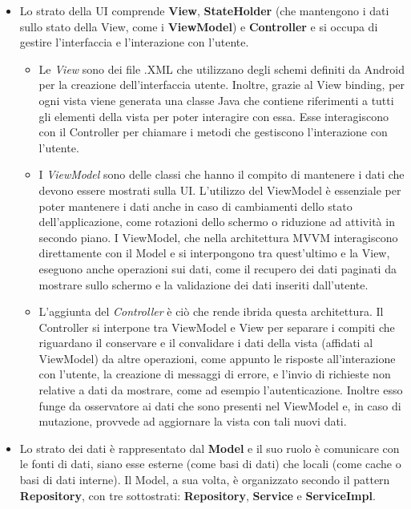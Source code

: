             \begin{itemize}
                \item Lo strato della UI comprende \textbf{View}, \textbf{StateHolder} (che mantengono i dati sullo stato della View, come i \textbf{ViewModel}) e \textbf{Controller} e si occupa di gestire l'interfaccia e l'interazione con l'utente.
                    \begin{itemize}
                        \item Le \textit{View} sono dei file .XML che utilizzano degli schemi definiti da Android per la creazione dell'interfaccia utente. Inoltre, grazie al View binding, per ogni vista viene generata una classe Java che contiene riferimenti a tutti gli elementi della vista per poter interagire con essa. Esse interagiscono con il Controller per chiamare i metodi che gestiscono l'interazione con l'utente.
                        \item I \textit{ViewModel} sono delle classi che hanno il compito di mantenere i dati che devono essere mostrati sulla UI. L'utilizzo del ViewModel è essenziale per poter mantenere i dati anche in caso di cambiamenti dello stato dell'applicazione, come rotazioni dello schermo o riduzione ad attività in secondo piano. I ViewModel, che nella architettura MVVM interagiscono direttamente con il Model e si interpongono tra quest'ultimo e la View, eseguono anche operazioni sui dati, come il recupero dei dati paginati da mostrare sullo schermo e la validazione dei dati inseriti dall'utente.
                        \item L'aggiunta del \textit{Controller} è ciò che rende ibrida questa architettura. Il Controller si interpone tra ViewModel e View per separare i compiti che riguardano il conservare e il convalidare i dati della vista (affidati al ViewModel) da altre operazioni, come appunto le risposte all'interazione con l'utente, la creazione di messaggi di errore, e l'invio di richieste non relative a dati da mostrare, come ad esempio l'autenticazione. Inoltre esso funge da osservatore ai dati che sono presenti nel ViewModel e, in caso di mutazione, provvede ad aggiornare la vista con tali nuovi dati.
                    \end{itemize}
                \item Lo strato dei dati è rappresentato dal \textbf{Model} e il suo ruolo è comunicare con le fonti di dati, siano esse esterne (come basi di dati) che locali (come cache o basi di dati interne). Il Model, a sua volta, è organizzato secondo il pattern \textbf{Repository}, con tre sottostrati: \textbf{Repository}, \textbf{Service} e \textbf{ServiceImpl}.

\end{itemize}
